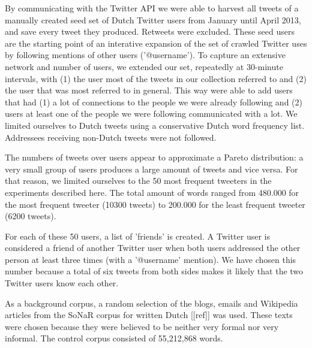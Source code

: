 \documentclass[11pt]{article}
\begin{document}
By communicating with the Twitter API we were able to harvest all tweets of a manually created seed set of Dutch Twitter users from January until April 2013, and save every tweet they produced. Retweets were excluded. These seed users are the starting point of an interative expansion of the set of crawled Twitter uses by following mentions of other users ('@username'). To capture an extensive network and number of users, we extended our set, repeatedly at 30-minute intervals, with (1) the user most of the tweets in our collection referred to and (2) the user that was most referred to in general. This way were able to add users that had (1) a lot of connections to the people we were already following and (2) users at least one of the people we were following communicated with a lot. We limited ourselves to Dutch tweets using a conservative Dutch word frequency list. Addressees receiving non-Dutch tweets were not followed.

The numbers of tweets over users appear to approximate a Pareto distribution: a very small group of users produces a large amount of tweets and vice versa. For that reason, we limited ourselves to the 50 most frequent tweeters in the experiments described here. The total amount of words ranged from 480.000 for the most frequent tweeter (10300 tweets) to 200.000 for the least frequent tweeter (6200 tweets). 

For each of these 50 users, a list of 'friends' is created. A Twitter user is considered a friend of another Twitter user when both users addressed the other person at least three times (with a '@username' mention). We have chosen this number because a total of six tweets from both sides makes it likely that the two Twitter users know each other. 

As a background corpus, a random selection of the blogs, emails and Wikipedia articles from the SoNaR corpus for written Dutch [[ref]] was used. These texts were chosen because they were believed to be neither very formal nor very informal. The control corpus consisted of 55,212,868 words.
\end{document}

